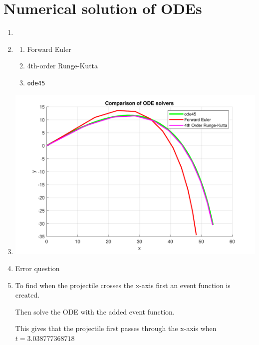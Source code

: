 \documentclass[a4paper,11pt]{article}
\begin{document}
\section{Numerical solution of ODEs}
\begin{enumerate}
	\item 
	
	
	\item\begin{enumerate}
		\item Forward Euler
		
		\item 4th-order Runge-Kutta
		
		\item \verb*|ode45|
		
	\end{enumerate}


	\item 		
	\begin{center}
		\includegraphics[scale=0.7]{images/Q3c.pdf}
	\end{center}

	
	\item Error question
	
	
	\item To find when the projectile crosses the x-axis first an event 
	function is created.
	
	Then solve the ODE with the added event function.
	
	This gives that the projectile first passes through the x-axis when 
	$t=3.038777368718$
	

\end{enumerate}
\end{document}
